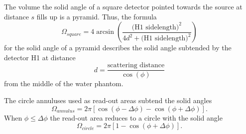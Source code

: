 The volume the solid angle of a square detector pointed towards the source at distance $s$ fills up is a pyramid. Thus, the formula \begin{equation}\Omega_{square} = 4 \arcsin\left(\frac{\text{(H1 sidelength)}^2}{4d^2+\text{(H1 sidelength)}^2}\right)\end{equation}for the solid angle of a pyramid describes the solid angle subtended by the detector H1 at distance \begin{equation}d = \frac{\text{scattering distance}}{\cos(\phi)}\end{equation}from the middle of the water phantom.

The circle annuluses used as read-out areas subtend the solid angles \begin{equation}\Omega_{annulus} = 2 \pi [\cos(\phi - \Delta\phi) - \cos(\phi + \Delta\phi)].\end{equation}When $\phi \le \Delta\phi$ the read-out area reduces to a circle with the solid angle \begin{equation}\Omega_{circle} = 2 \pi [1 - \cos(\phi + \Delta\phi)].\end{equation}



